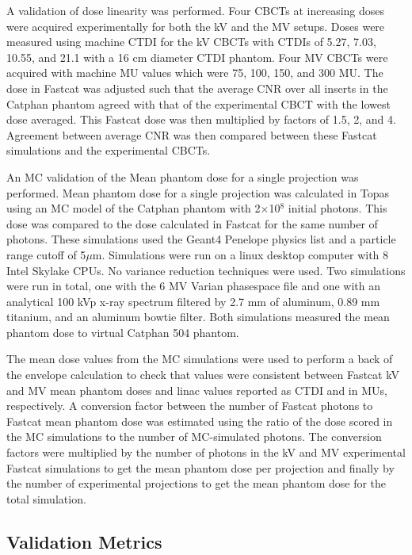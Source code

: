 A validation of dose linearity was performed. Four CBCTs at increasing doses were acquired experimentally for both the kV and the MV setups. Doses were measured using machine CTDI for the kV CBCTs with CTDIs of 5.27, 7.03, 10.55, and 21.1 with a 16 cm diameter CTDI phantom. Four MV CBCTs were acquired with machine MU values which were 75, 100, 150, and 300 MU. The dose in Fastcat was adjusted such that the average CNR over all inserts in the Catphan phantom agreed with that of the experimental CBCT with the lowest dose averaged. This Fastcat dose was then multiplied by factors of 1.5, 2, and 4. Agreement between average CNR was then compared between these Fastcat simulations and the experimental CBCTs.

An MC validation of the Mean phantom dose for a single projection was performed. Mean phantom dose for a single projection was calculated in Topas \cite{Perl2012TOPAS:Applications} using an MC model of the Catphan phantom with 2$\times$10$^8$ initial photons. This dose was compared to the dose calculated in Fastcat for the same number of photons. These simulations used the Geant4 Penelope physics list and a particle range cutoff of 5$\mu$m. Simulations were run on a linux desktop computer with 8 Intel Skylake CPUs. No variance reduction techniques were used. Two simulations were run in total, one with the 6 MV Varian phasespace file and one with an analytical 100 kVp x-ray spectrum filtered by 2.7 mm of aluminum, 0.89 mm titanium, and an aluminum bowtie filter. Both simulations measured the mean phantom dose to virtual Catphan 504 phantom.

The mean dose values from the MC simulations were used to perform a back of the envelope calculation to check that values were consistent between Fastcat kV and MV mean phantom doses and linac values reported as CTDI and in MUs, respectively. A conversion factor between the number of Fastcat photons to Fastcat mean phantom dose was estimated using the ratio of the dose scored in the MC simulations to the number of MC-simulated photons. The conversion factors were multiplied by the number of photons in the kV and MV experimental Fastcat simulations to get the mean phantom dose per projection and finally by the number of experimental projections to get the mean phantom dose for the total simulation.

\subsection{Validation Metrics}

